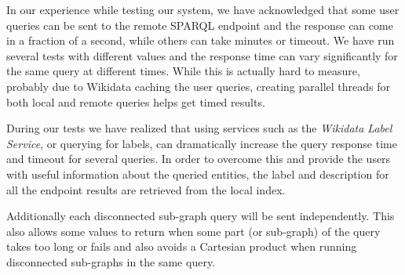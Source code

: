In our experience while testing our system, we have acknowledged that some user queries can be sent to the remote SPARQL endpoint and the response can come in a fraction of a second, while others can take minutes or timeout. 
We have run several tests with different values and the response time can vary significantly for the same query at different times. While this is actually hard to measure, probably due to Wikidata caching the user queries, creating parallel threads for both local and remote queries helps get timed results.


During our tests we have realized that using services such as the \textit{Wikidata Label Service}, or querying for labels, can dramatically increase the query response time and timeout for several queries. In order to overcome this and provide the users with useful information about the queried entities, the label and description for all the endpoint results are retrieved from the local index.

Additionally each disconnected sub-graph query will be sent independently. This also allows some values to return when some part (or sub-graph) of the query takes too long or fails and also avoids a Cartesian product when running disconnected sub-graphs in the same query.